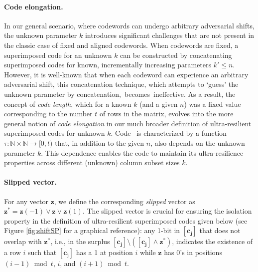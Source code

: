 \documentclass[11pt]{article}
\begin{document}
\B
\paragraph{Code elongation.}
In our general scenario, where codewords can undergo arbitrary 
adversarial shifts, the unknown parameter $k$ introduces significant challenges that are not 
present in the classic case of fixed and aligned codewords. When codewords are fixed, 
a superimposed code for an unknown $k$ can be constructed by concatenating superimposed 
codes for known, incrementally increasing parameters $k' \le n$. However, it is well-known 
that when each codeword can experience an arbitrary adversarial shift, this concatenation technique, 
which attempts to `guess' the unknown parameter by concatenation,~becomes~ineffective.
As a result, the concept of \textit{code length}, which for a known $k$ (and a given $n$) was a 
fixed value corresponding to the number $t$ of rows in the matrix, evolves into the more general 
notion of \textit{code elongation} in our much broader definition of ultra-resilient superimposed 
codes for unknown $k$.
Code \elongation\ is characterized by a function $\tau: \mathbb{N} \times \mathbb{N} \to [0,t)$ 
that, in addition to the given $n$, also depends on the unknown parameter $k$. 
This dependence enables the code to maintain its ultra-resilience properties across different 
(unknown) column subset sizes $k$.

\B
\paragraph{Slipped vector.}
For any vector $\mathbf{z}$, we define the corresponding \textit{slipped} vector as 
$\mathbf{z^*} = \mathbf{z}(-1) \lor \mathbf{z} \lor \mathbf{z}(1)$.
The slipped vector is crucial for ensuring the isolation property in the
definition of ultra-resilient superimposed codes given below 
(see Figure \ref{fig:shiftSP}
for a graphical reference): 
any 1-bit in $\mathbf{[c_{j}]}$ that does not overlap with 
$\mathbf{z^*}$, i.e., in the surplus 
$\mathbf{[c_{j}]} \setminus (\mathbf{[c_{j}]} \wedge \mathbf{z^*})$, 
indicates the existence of a row $i$ such that 
$\mathbf{[c_{j}]}$ has a 1 at position $i$ while $\mathbf{z}$ has 0's in positions 
$(i-1) \bmod t$, $i$, and $(i+1) \bmod t$.
\end{document}

